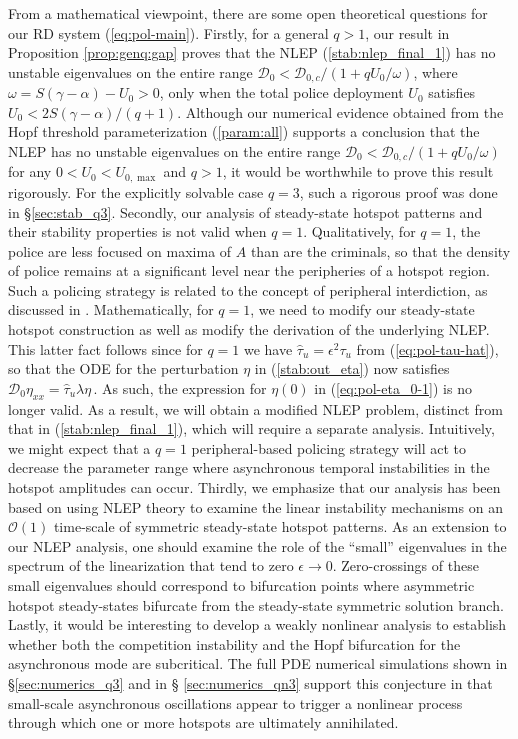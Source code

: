 \documentclass{article}%
\begin{document}
From a mathematical viewpoint, there are some open theoretical
questions for our RD system (\ref{eq:pol-main}). Firstly, for a
general $q>1$, our result in Proposition \ref{prop:genq:gap} proves
that the NLEP (\ref{stab:nlep_final_1}) has no unstable eigenvalues on
the entire range ${\mathcal D}_0<{\mathcal
  D_{0,c}/\left(1+{qU_0/\omega}\right)}$, where
$\omega=S(\gamma-\alpha)-U_0>0$, only when the total police deployment
$U_0$ satisfies $U_0<{2S(\gamma-\alpha)/(q+1)}$. Although our
numerical evidence obtained from the Hopf threshold parameterization
(\ref{param:all}) supports a conclusion that the NLEP has no unstable
eigenvalues on the entire range ${\mathcal D}_0<{\mathcal
  D_{0,c}/\left(1+{qU_0/\omega}\right)}$ for any $0<U_0<U_{0,\max}$
and $q>1$, it would be worthwhile to prove this result rigorously. For
the explicitly solvable case $q=3$, such a rigorous proof was done in
\S \ref{sec:stab_q3}. Secondly, our analysis of steady-state hotspot
patterns and their stability properties is not valid when
$q=1$. Qualitatively, for $q=1$, the police are less focused on maxima
of $A$ than are the criminals, so that the density of police remains
at a significant level near the peripheries of a hotspot region. Such
a policing strategy is related to the concept of peripheral
interdiction, as discussed in \cite{jbc}. Mathematically, for $q=1$,
we need to modify our steady-state hotspot construction as well as
modify the derivation of the underlying NLEP. This latter fact follows
since for $q=1$ we have $\hat{\tau}_{u} =\epsilon^{2}\tau_{u}$ from
(\ref{eq:pol-tau-hat}), so that the ODE for the perturbation $\eta$ in
(\ref{stab:out_eta}) now satisfies ${\mathcal
  D}_{0}\eta_{xx}=\hat{\tau}_u\lambda\eta\,.$ As such, the expression
for $\eta(0)$ in (\ref{eq:pol-eta_0-1}) is no longer valid. As a
result, we will obtain a modified NLEP problem, distinct from that in
(\ref{stab:nlep_final_1}), which will require a separate analysis.
Intuitively, we might expect that a $q=1$ peripheral-based policing
strategy will act to decrease the parameter range where asynchronous
temporal instabilities in the hotspot amplitudes can occur.  Thirdly,
we emphasize that our analysis has been based on using NLEP theory to
examine the linear instability mechanisms on an ${\mathcal O}(1)$
time-scale of symmetric steady-state hotspot patterns. As an extension
to our NLEP analysis, one should examine the role of the ``small''
eigenvalues in the spectrum of the linearization that tend to zero
$\epsilon\to 0$. Zero-crossings of these small eigenvalues should
correspond to bifurcation points where asymmetric hotspot
steady-states bifurcate from the steady-state symmetric solution
branch.  Lastly, it would be interesting to develop a weakly nonlinear
analysis to establish whether both the competition instability and the
Hopf bifurcation for the asynchronous mode are subcritical. The full
PDE numerical simulations shown in \S \ref{sec:numerics_q3} and in \S
\ref{sec:numerics_qn3} support this conjecture in that small-scale
asynchronous oscillations appear to trigger a nonlinear process
through which one or more hotspots are ultimately annihilated.
\end{document}
